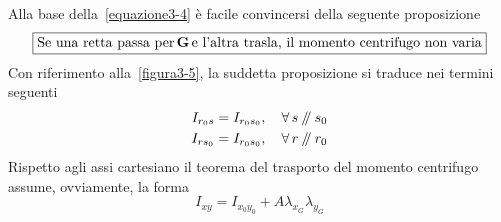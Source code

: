 \noindent Alla base della~\eqref{equazione3-4} è facile convincersi della seguente proposizione
\begin{equation*}
\boxed{\textup{Se una retta passa per}\,\mathbf{G}\,\textup{e l'altra trasla, il momento centrifugo non varia}}
\end{equation*}
Con riferimento alla~\ref{figura3-5}, la suddetta proposizione si traduce nei termini seguenti 
\begin{align*}
I_{r_{0}s} &= I_{r_{0}s_{0}}, \quad \forall\,s\,\mathbin{\!/\mkern-5mu/\!}\,s_{0} \\
I_{rs_{0}} &= I_{r_{0}s_{0}}, \quad \forall\,r\,\mathbin{\!/\mkern-5mu/\!}\,r_{0}
\end{align*}
Rispetto agli assi cartesiano il teorema del trasporto del momento centrifugo assume, ovviamente, la forma 
\begin{equation} \label{equazione3-5}
\boxed{I_{xy}=I_{x_{0}y_{0}}+A\lambda_{x_{G}}\lambda_{y_{G}}} \tag{3.5}
\end{equation}
